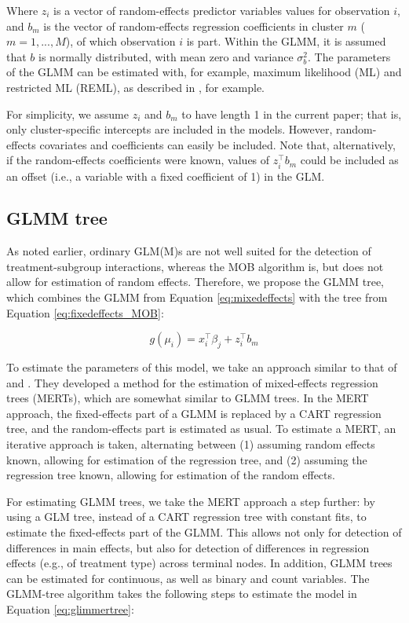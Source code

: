 \documentclass[nobf,doc]{apa}
\begin{document}
Where $z_{i}$ is a vector of random-effects predictor variables values for observation $i$, and $b_{m}$ is the vector of random-effects regression coefficients in cluster $m$ ($m=1,...,M$), of which observation $i$ is part. Within the GLMM, it is assumed that $b$ is normally distributed, with mean zero and variance $\sigma^{2}_{b}$. The parameters of the GLMM can be estimated with, for example, maximum likelihood (ML) and restricted ML (REML), as described in , for example.  

For simplicity, we assume $z_{i}$ and $b_{m}$ to have length 1 in the current paper; that is, only cluster-specific intercepts are included in the models. However, random-effects covariates and coefficients can easily be included. Note that, alternatively, if the random-effects coefficients were known, values of $z_{i}^{\top}b_{m}$ could be included as an offset (i.e., a variable with a fixed coefficient of 1) in the GLM.



\subsection{GLMM tree}

As noted earlier, ordinary GLM(M)s are not well suited for the detection of treatment-subgroup interactions, whereas the MOB algorithm is, but does not allow for estimation of random effects. Therefore, we propose the GLMM tree, which combines the GLMM from Equation \ref{eq:mixedeffects} with the tree from Equation \ref{eq:fixedeffects_MOB}: 

\begin{equation}
\label{eq:glimmertree}
	g(\mu_{i}) = x_{i}^{\top}\beta_{j} + z_{i}^{\top}b_{m}
\end{equation}

To estimate the parameters of this model, we take an approach similar to that of  and . They developed a method for the estimation of mixed-effects regression trees (MERTs), which are somewhat similar to GLMM trees. In the MERT approach, the fixed-effects part of a GLMM is replaced by a CART regression tree, and the random-effects part is estimated as usual. To estimate a MERT, an iterative approach is taken, alternating between (1) assuming random effects known, allowing for estimation of the regression tree, and (2) assuming the regression tree known, allowing for estimation of the random effects. 

For estimating GLMM trees, we take the MERT approach a step further: by using a GLM tree, instead of a CART regression tree with constant fits, to estimate the fixed-effects part of the GLMM. This allows not only for detection of differences in main effects, but also for detection of differences in regression effects (e.g., of treatment type) across terminal nodes. In addition, GLMM trees can be estimated for continuous, as well as binary and count variables. The GLMM-tree algorithm takes the following steps to estimate the model in Equation \ref{eq:glimmertree}:
\end{document}
